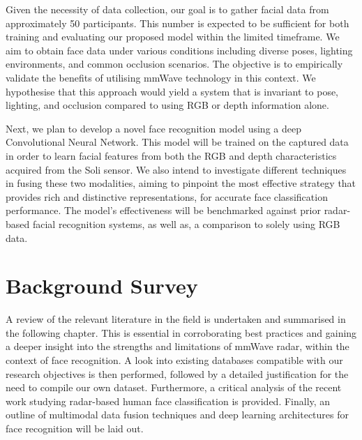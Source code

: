 \documentclass{interim}
\begin{document}
Given the necessity of data collection, our goal is to gather facial data from approximately 50 participants. This number is expected to be sufficient for both training and evaluating our proposed model within the limited timeframe. We aim to obtain face data under various conditions including diverse poses, lighting environments, and common occlusion scenarios. The objective is to empirically validate the benefits of utilising mmWave technology in this context. We hypothesise that this approach would yield a system that is invariant to pose, lighting, and occlusion compared to using RGB or depth information alone.

Next, we plan to develop a novel face recognition model using a deep Convolutional Neural Network. This model will be trained on the captured data in order to learn facial features from both the RGB and depth characteristics acquired from the Soli sensor. We also intend to investigate different techniques in fusing these two modalities, aiming to pinpoint the most effective strategy that provides rich and distinctive representations, for accurate face classification performance. The model's effectiveness will be benchmarked against prior radar-based facial recognition systems, as well as, a comparison to solely using RGB data.




\section{Background Survey}
A review of the relevant literature in the field is undertaken and summarised in the following chapter. This is essential in corroborating best practices and gaining a deeper insight into the strengths and limitations of mmWave radar, within the context of face recognition. A look into existing databases compatible with our research objectives is then performed, followed by a detailed justification for the need to compile our own dataset. Furthermore, a critical analysis of the recent work studying radar-based human face classification is provided. Finally, an outline of multimodal data fusion techniques and deep learning architectures for face recognition will be laid out.
\end{document}
